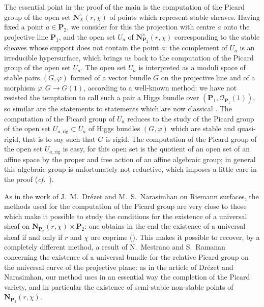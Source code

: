 \documentclass[12pt,english]{smfart}%
\theoremstyle{plain}
\theoremstyle{definition}
\theoremstyle{remark}
\newcommand{\PP}{\mathbf{P}}
\newcommand{\NN}{\mathbf{N}}           %
\newcommand{\Oh}{\mathcal{O}}
\begin{document}
The essential point in the proof of the main  is the computation of the Picard group of the open set $\NN^{s}_{X}(r,\chi)$ of points which represent stable sheaves. Having fixed a point $a\in\PP_{2}$, we consider for this the projection with centre $a$ onto the projective line $\PP_{1}$, and the open set $U_{a}$ of $\NN^{s}_{\PP_{2}}(r,\chi)$ corresponding to the stable sheaves whose support does not contain the point $a$: the complement of $U_{a}$ is an irreducible hypersurface, which brings us back to the computation of the Picard group of the open set $U_{a}$. The open set $U_{a}$ is interpreted as a moduli space of stable pairs $(G,\varphi)$ formed of a vector bundle $G$ on the projective line and of a morphism $\varphi:G\to G(1)$, according to a well-known method: we have not resisted the temptation to call such a pair a Higgs bundle over $(\PP_{1},\Oh_{\PP_{1}}(1))$, so similar are the statements to statements which are now classical \cite{Sim2}. The computation of the Picard group of $U_{a}$ reduces to the study of the Picard group of the open set $U_{a,\mathrm{rig}}\subset U_{a}$ of Higgs bundles $(G,\varphi)$ which are stable and quasi-rigid, that is to say such that $G$ is rigid. The computation of the Picard group of the open set $U_{a,\mathrm{rig}}$ is easy, for this open set is the quotient of an open set of an affine space by the proper and free action of an affine algebraic group; in general this algebraic group is unfortunately not reductive, which imposes a little care in the proof (\emph{cf.}\ ).

As in the work of J.~M.~Dr\'ezet and M.~S.~Narasimhan \cite{Dre3} on Riemann surfaces, the methods used for the computation of the Picard group are very close to those which make it possible to study the conditions for the existence of a universal sheaf on $\NN_{\PP_{2}}(r,\chi)\times\PP_{2}$: one obtains in the end the existence of a universal sheaf if and only if $r$ and $\chi$ are coprime (). This makes it possible to recover, by a completely different method, a result of N.~Mestrano and S.~Ramanan \cite{Mes} concerning the existence of a universal bundle for the relative Picard group on the universal curve of the projective plane: as in the article of Dr\'ezet and Narasimhan, our method uses in an essential way the completion of the Picard variety, and in particular the existence of semi-stable non-stable points of $\NN_{\PP_{2}}(r,\chi)$.
\end{document}
